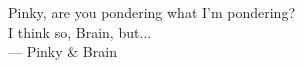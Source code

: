 \thispagestyle{empty}
{}

\vspace*{3cm}

\begin{center}
Pinky, are you pondering what I'm pondering? \\
I think so, Brain, but...
\\ \medskip
    --- Pinky \& Brain
\end{center}